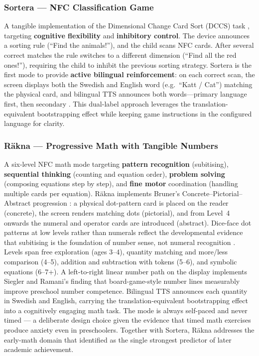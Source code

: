 \documentclass[12pt, a4paper]{article}
\begin{document}
\subsubsection{Sortera --- NFC Classification Game}
A tangible implementation of the Dimensional Change Card Sort (DCCS) task
\citep{zelazo2006dccs}, targeting \textbf{cognitive flexibility} and
\textbf{inhibitory control}. The device announces a sorting rule (``Find the
animals!''), and the child scans NFC cards. After several correct matches the
rule switches to a different dimension (``Find all the red ones!''), requiring
the child to inhibit the previous sorting strategy. Sortera is the first mode
to provide \textbf{active bilingual reinforcement}: on each correct scan, the
screen displays both the Swedish and English word (e.g.\ ``Katt / Cat'')
matching the physical card, and bilingual TTS announces both words---primary
language first, then secondary \citep{tan2024translation}. This dual-label
approach leverages the translation-equivalent bootstrapping effect while keeping
game instructions in the configured language for clarity.

\subsubsection{Räkna --- Progressive Math with Tangible Numbers}
A six-level NFC math mode targeting \textbf{pattern recognition} (subitising),
\textbf{sequential thinking} (counting and equation order),
\textbf{problem solving} (composing equations step by step), and
\textbf{fine motor} coordination (handling multiple cards per equation). Räkna
implements Bruner's Concrete--Pictorial--Abstract progression
\citep{bruner1966instruction,willingham2017manipulatives}: a physical dot-pattern
card is placed on the reader (concrete), the screen renders matching dots
(pictorial), and from Level~4 onwards the numeral and operator cards are
introduced (abstract). Dice-face dot patterns at low levels rather than
numerals reflect the developmental evidence that subitising is the foundation
of number sense, not numeral recognition
\citep{clementssarama2014learning}. Levels span free exploration (ages
3--4), quantity matching and more/less comparison (4--5), addition and
subtraction with tokens (5--6), and symbolic equations (6--7+). A left-to-right
linear number path on the display implements Siegler and Ramani's
\citeyearpar{siegler2009playing} finding that board-game-style number lines
measurably improve preschool number competence. Bilingual TTS announces each
quantity in Swedish and English, carrying the translation-equivalent
bootstrapping effect \citep{tan2024translation} into a cognitively engaging
math task. The mode is always self-paced and never timed --- a deliberate
design choice given the evidence that timed math exercises produce anxiety
even in preschoolers. Together with Sortera, Räkna addresses the early-math
domain that \citet{duncan2007school} identified as the single strongest
predictor of later academic achievement.
\end{document}
